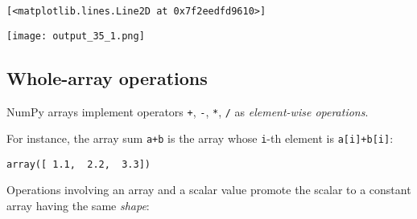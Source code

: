 \documentclass[english,serif,mathserif,xcolor=pdftex,dvipsnames,table]{beamer}
\begin{document}
\begin{verbatim}
[<matplotlib.lines.Line2D at 0x7f2eedfd9610>]
\end{verbatim}

\texttt{[image: output\_35\_1.png]}

\subsection{Whole-array operations}\label{whole-array-operations}

NumPy arrays implement operators \texttt{+}, \texttt{-}, \texttt{*},
\texttt{/} as \emph{element-wise operations}.

For instance, the array sum \texttt{a+b} is the array whose
\texttt{i}-th element is \texttt{a{[}i{]}+b{[}i{]}}:

\begin{Shaded}
\begin{Highlighting}[]
\OperatorTok{=} \NormalTok{np.array([}\NormalTok{, }\NormalTok{, }\NormalTok{])}
\OperatorTok{=} \NormalTok{np.array([}\NormalTok{, }\NormalTok{, }\NormalTok{])}
\OperatorTok{=} \OperatorTok{+} 
\end{Highlighting}
\end{Shaded}

\begin{Shaded}
\begin{Highlighting}[]
\end{Highlighting}
\end{Shaded}

\begin{verbatim}
array([ 1.1,  2.2,  3.3])
\end{verbatim}

Operations involving an array and a scalar value promote the scalar to a
constant array having the same \emph{shape}:

\begin{Shaded}
\begin{Highlighting}[]
\OperatorTok{=} \OperatorTok{+} 
\OperatorTok{=} \OperatorTok{-} 
\end{Highlighting}
\end{Shaded}

\begin{Shaded}
\begin{Highlighting}[]
\OperatorTok{=} \NormalTok{, }\OperatorTok{=}\NormalTok{[}\NormalTok{, }\NormalTok{])}

\OperatorTok{=}\NormalTok{)}
\OperatorTok{=}\NormalTok{)}
\end{Highlighting}
\end{Shaded}
\end{document}
